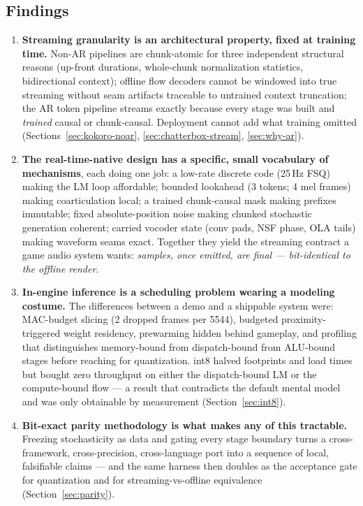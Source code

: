 \documentclass[11pt,a4paper]{article}
\begin{document}
\subsection{Findings}

\begin{enumerate}[leftmargin=2em]
\item \textbf{Streaming granularity is an architectural property, fixed at training
time.} Non-AR pipelines are chunk-atomic for three independent structural reasons
(up-front durations, whole-chunk normalization statistics, bidirectional context);
offline flow decoders cannot be windowed into true streaming without seam artifacts
traceable to untrained context truncation; the AR token pipeline streams exactly
because every stage was built and \emph{trained} causal or chunk-causal. Deployment
cannot add what training omitted (Sections~\ref{sec:kokoro-noar},
\ref{sec:chatterbox-stream}, \ref{sec:why-ar}).
\item \textbf{The real-time-native design has a specific, small vocabulary of
mechanisms}, each doing one job: a low-rate discrete code (25\,Hz FSQ) making the LM
loop affordable; bounded lookahead (3 tokens; 4 mel frames) making coarticulation local;
a trained chunk-causal mask making prefixes immutable; fixed absolute-position noise
making chunked stochastic generation coherent; carried vocoder state (conv pads, NSF
phase, OLA tails) making waveform seams exact. Together they yield the streaming
contract a game audio system wants: \emph{samples, once emitted, are final ---
bit-identical to the offline render}.
\item \textbf{In-engine inference is a scheduling problem wearing a modeling costume.}
The differences between a demo and a shippable system were: MAC-budget slicing
(2 dropped frames per 5544), budgeted proximity-triggered weight residency,
prewarming hidden behind gameplay, and profiling that distinguishes memory-bound from
dispatch-bound from ALU-bound stages before reaching for quantization. int8 halved
footprints and load times but bought zero throughput on either the dispatch-bound LM
or the compute-bound flow --- a result that contradicts the default mental model and
was only obtainable by measurement (Section~\ref{sec:int8}).
\item \textbf{Bit-exact parity methodology is what makes any of this tractable.}
Freezing stochasticity as data and gating every stage boundary turns a
cross-framework, cross-precision, cross-language port into a sequence of local,
falsifiable claims --- and the same harness then doubles as the acceptance gate for
quantization and for streaming-vs-offline equivalence (Section~\ref{sec:parity}).
\end{enumerate}
\end{document}

